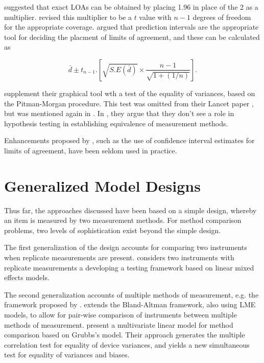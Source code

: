 \documentclass[12pt, a4paper]{report}
\theoremstyle{plain}
\theoremstyle{definition}
\theoremstyle{remark}
\begin{document}
\citet{BA86} suggested that exact LOAs can be obtained by placing 1.96 in place of the 2 as a multiplier. \citet{BA99} revised this multiplier to be a $t$ value with $n-1$ degrees of freedom for the appropriate coverage.
\citet{BXC2008} argued that prediction intervals are the appropriate tool for deciding the placment of limits of agreement, and these can be calculated as

\[ \bar{d} \pm t_{n-1}.\left[ \sqrt{S.E(\bar{d})} \times \frac{n-1}{\sqrt{1 + (1/n)}} \right]. \]


\citet{BA83} supplement their graphical tool wth a test of the equality of variances, based on the Pitman-Morgan procedure. This test was omitted from their Lancet paper \citep{BA86}, but was mentioned again in \citet{BA99}. In \citet{BA99}, they argue that they don't see a role in hypothesis testing in establishing equivalence of measurement methods.






Enhancements proposed by \citet{BA99}, such as the use of confidence interval estimates for limits of agreement, have been seldom used in practice.

\section{Generalized Model Designs}
Thus far, the approaches discussed have been based on a simple design, whereby an item is measured by two measurement methods. For method comparison problems, two levels of sophistication exist beyond the simple design. 

The first generalization of the design accounts for comparing two instruments when replicate measurements are present. \citet{ARoy2009} considers two instruments with replicate measurements a developing a testing framework based on linear mixed effects models.

The second generalization accounts of multiple methods of measurement, e.g. the framework proposed by \citet{Grubbs73}. \citet{BXC2008} extends the Bland-Altman framework, also using LME models, to allow for pair-wise comparison of instruments between multiple methods of measurement. \citet{christensenblackwood} present a multivariate linear model for method comparison based on Grubbs's model. Their approach generates the multiple  correlation test for equality of device variances, and yields a new simultaneous test for equality of variances and biases.
\end{document}
